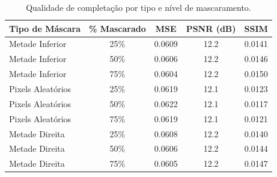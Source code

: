 \begin{table}[htbp]
\centering
\caption{Qualidade de completação por tipo e nível de mascaramento.}
\label{tab:completion}
\begin{tabular}{lcccc}
\hline
\textbf{Tipo de Máscara} & \textbf{\% Mascarado} & \textbf{MSE} & \textbf{PSNR (dB)} & \textbf{SSIM} \\
\hline
Metade Inferior & 25\% & 0.0609 & 12.2 & 0.0141 \\
Metade Inferior & 50\% & 0.0606 & 12.2 & 0.0146 \\
Metade Inferior & 75\% & 0.0604 & 12.2 & 0.0150 \\
\hline
Pixels Aleatórios & 25\% & 0.0619 & 12.1 & 0.0123 \\
Pixels Aleatórios & 50\% & 0.0622 & 12.1 & 0.0117 \\
Pixels Aleatórios & 75\% & 0.0619 & 12.1 & 0.0121 \\
\hline
Metade Direita & 25\% & 0.0608 & 12.2 & 0.0140 \\
Metade Direita & 50\% & 0.0606 & 12.2 & 0.0144 \\
Metade Direita & 75\% & 0.0605 & 12.2 & 0.0147 \\
\hline
\end{tabular}
\end{table}
